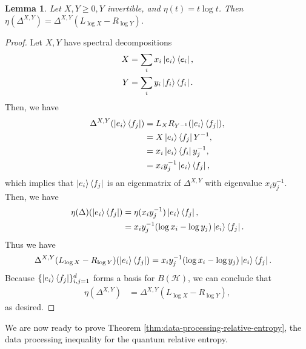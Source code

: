 \documentclass[notoc]{tufte-book}
\newtheorem{lemma}[theorem]{Lemma}
\begin{document}
\begin{tcolorbox}[colframe=white,breakable, colback=black!5, arc=0pt, outer arc=0pt]
\begin{lemma}\label{lem:lemma-9}
Let $X,Y \geq 0, Y$ invertible, and $\eta (t) = t \log{t}$. Then $\eta (\Delta^{X,Y}) = \Delta^{X,Y}(L_{\log{X}}-R_{\log{Y}})$.
\end{lemma}
\end{tcolorbox}

\begin{proof}
Let $X,Y$ have spectral decompositions
\begin{align}
    X&=\sum_i x_i \ket{e_i}\bra{e_i},\\ 
    Y&= \sum_i y_i \ket{f_i}\bra{f_i}.
\end{align}
Then, we have 
\begin{align}
    \Delta^{X,Y}(\ket{e_i} \bra{f_j})&= L_{X} R_{Y^{-1}} (\ket{e_i}\bra{f_j}),\\
    &= X \ket{e_i}\bra{f_j} Y^{-1},\\
    &=x_i \ket{e_i}\bra{f_i} y_j^{-1}, \\
    &= x_i y^{-1}_j \ket{e_i}\bra{f_j},
\end{align}
which implies that $\ket{e_i}\bra{f_j}$ is an eigenmatrix of $\Delta^{X,Y}$ with eigenvalue $x_i y^{-1}_j$. Then, we have
\begin{align}
    \eta(\Delta) (\ket{e_i}\bra{f_j}) &= \eta(x_i y^{-1}_j) \ket{e_i}\bra{f_j},\\
    &= x_i y_j^{-1} (\log{x_i}-\log{y_j}) \ket{e_i} \bra{f_j}.
\end{align}
Thus we have
\begin{align}
    \Delta^{X,Y} (L_{\log{X}}-R_{\log{Y}})(\ket{e_i}\bra{f_j}) &= x_i y^{-1}_j (\log{x_i} - \log{y_j}) \ket{e_i}\bra{f_j}.
\end{align}
Because $\{\ket{e_i}\bra{f_j}\}_{i,j=1}^d$ forms a basis for $B(\mathcal{H})$, we can conclude that
\begin{align}
    \eta(\Delta^{X,Y}) &= \Delta^{X,Y}(L_{\log{X}}-R_{\log{Y}}),
\end{align}
as desired.
\end{proof}

We are now ready to prove Theorem \ref{thm:data-processing-relative-entropy}, the data processing inequality for the quantum relative entropy.
\end{document}
